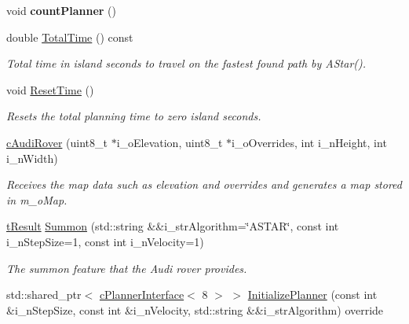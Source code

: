 \begin{DoxyCompactItemize}
\mbox{\label{classplanner_1_1c_audi_rover_ab4ff29dbdcf096e9f3ec0a734ed7b2d3}} 
void {\bfseries count\+Planner} ()
\item 
\mbox{\label{classplanner_1_1c_audi_rover_a3457f112b5906654ca4dbefef7ea7e46}} 
double \mbox{\hyperlink{classplanner_1_1c_audi_rover_a3457f112b5906654ca4dbefef7ea7e46}{Total\+Time}} () const
\begin{DoxyCompactList}\small\item\em Total time in island seconds to travel on the fastest found path by A\+Star(). \end{DoxyCompactList}\item 
\mbox{\label{classplanner_1_1c_audi_rover_a581d4a30c727d6fbe224b317834a45ba}} 
void \mbox{\hyperlink{classplanner_1_1c_audi_rover_a581d4a30c727d6fbe224b317834a45ba}{Reset\+Time}} ()
\begin{DoxyCompactList}\small\item\em Resets the total planning time to zero island seconds. \end{DoxyCompactList}\item 
\mbox{\hyperlink{classplanner_1_1c_audi_rover_abafb926aca93fb8382284a10bd341986}{c\+Audi\+Rover}} (uint8\+\_\+t $\ast$i\+\_\+o\+Elevation, uint8\+\_\+t $\ast$i\+\_\+o\+Overrides, int i\+\_\+n\+Height, int i\+\_\+n\+Width)
\begin{DoxyCompactList}\small\item\em Receives the map data such as elevation and overrides and generates a map stored in m\+\_\+o\+Map. \end{DoxyCompactList}\item 
\mbox{\hyperlink{structt_result}{t\+Result}} \mbox{\hyperlink{classplanner_1_1c_audi_rover_ab43943af331caf76ac442280f1c667be}{Summon}} (std\+::string \&\&i\+\_\+str\+Algorithm=\char`\"{}A\+S\+T\+AR\char`\"{}, const int i\+\_\+n\+Step\+Size=1, const int i\+\_\+n\+Velocity=1)
\begin{DoxyCompactList}\small\item\em The summon feature that the Audi rover provides. \end{DoxyCompactList}\item 
std\+::shared\+\_\+ptr$<$ \mbox{\hyperlink{classplanner_1_1c_planner_interface}{c\+Planner\+Interface}}$<$ 8 $>$ $>$ \mbox{\hyperlink{classplanner_1_1c_audi_rover_afc214acc6e76a6820501971769bc270f}{Initialize\+Planner}} (const int \&i\+\_\+n\+Step\+Size, const int \&i\+\_\+n\+Velocity, std\+::string \&\&i\+\_\+str\+Algorithm) override

\end{DoxyCompactItemize}

